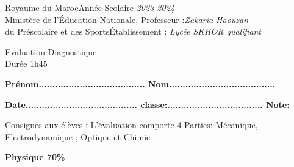\documentclass[12pt]{article}
\newcommand\headerMe[2]{\noindent{}#1\hfill#2}
\begin{document}
\headerMe{Royaume du Maroc}{Année Scolaire \emph{2023-2024}}\\
\headerMe{Ministère de l'Éducation Nationale, }{  Professeur :\emph{Zakaria Haouzan}}\\
\headerMe{du Préscolaire et des Sports}{Établissement : \emph{Lycée SKHOR qualifiant}}\\
\begin{center}
	\vspace{-0.5cm}
Evaluation Diagnostique \\
Durée 1h45
\\
\end{center}
\begin{center}
	\vspace{-0.2cm}
	\textbf{ Prénom.......................................  Nom.......................................}
	
	\vspace{0.5cm}
	\textbf{ Date.........................................  classe:................................... Note: }
		


\end{center}
\begin{center}

	\vspace{-0.75cm}
\underline{Consignes aux élèves : L’évaluation comporte 4 Parties: Mécanique, Electrodynamique ; Optique et Chimie}

	\hrulefill
\textbf{Physique 70\%}
\hrulefill
\end{center}
\end{document}
